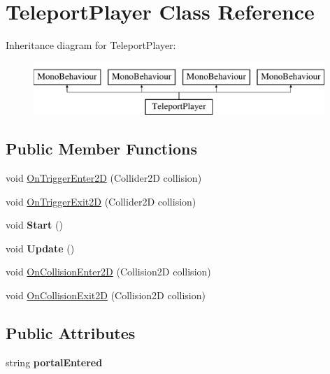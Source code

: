\hypertarget{class_teleport_player}{}\section{Teleport\+Player Class Reference}
\label{class_teleport_player}
Inheritance diagram for Teleport\+Player\+:\begin{figure}[H]
\begin{center}
\leavevmode
\includegraphics[height=2.000000cm]{class_teleport_player}
\end{center}
\end{figure}
\subsection*{Public Member Functions}
\begin{DoxyCompactItemize}
\item 
void \mbox{\hyperlink{class_teleport_player_a555b0c226c512d6bc9ce347b19957cd9}{On\+Trigger\+Enter2D}} (Collider2D collision)
\item 
void \mbox{\hyperlink{class_teleport_player_addd6af261867cf134ac87c580cebec92}{On\+Trigger\+Exit2D}} (Collider2D collision)
\item 
\mbox{\label{class_teleport_player_ad75d1699964434878bf8a31244a6a4af}} 
void {\bfseries Start} ()
\item 
\mbox{\label{class_teleport_player_ab8dc957d5f4ca8e3bee2d4b48ac0ed23}} 
void {\bfseries Update} ()
\item 
void \mbox{\hyperlink{class_teleport_player_a1ab94b6c3d13f1287f9127393afe2298}{On\+Collision\+Enter2D}} (Collision2D collision)
\item 
void \mbox{\hyperlink{class_teleport_player_ac85fc2322d2dc27de518434422c2c25e}{On\+Collision\+Exit2D}} (Collision2D collision)
\end{DoxyCompactItemize}
\subsection*{Public Attributes}
\begin{DoxyCompactItemize}
\item 
\mbox{\label{class_teleport_player_a3a1f027838b709b22b058dd5d8a4a140}} 
string {\bfseries portal\+Entered}
\end{DoxyCompactItemize}


